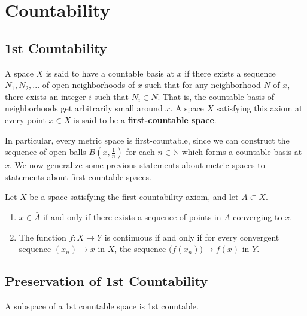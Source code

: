 \section{Countability}

\subsection{1st Countability}

  \begin{definition}[1st-Countability]
    A space $X$ is said to have a countable basis at $x$ if there exists a sequence $N_1, N_2, ...$ of open neighborhoods of $x$ such that for any neighborhood $N$ of $x$, there exists an integer $i$ such that $N_i \in N$. That is, the countable basis of neighborhoods get arbitrarily small around $x$. A space $X$ satisfying this axiom at every point $x \in X$ is said to be a \textbf{first-countable space}. 
  \end{definition}

  In particular, every metric space is first-countable, since we can construct the sequence of open balls $B (x, \frac{1}{n})$ for each $n \in \mathbb{N}$ which forms a countable basis at $x$. We now generalize some previous statements about metric spaces to statements about first-countable spaces. 

  \begin{theorem}
    Let $X$ be a space satisfying the first countability axiom, and let $A \subset X$. 
    \begin{enumerate}
      \item $x \in \bar{A}$ if and only if there exists a sequence of points in $A$ converging to $x$. 
      \item The function $f: X \longrightarrow Y$ is continuous if and only if for every convergent sequence $(x_n) \rightarrow x$ in $X$, the sequence $\big( f(x_n)\big) \rightarrow f(x)$ in $Y$. 
    \end{enumerate}
  \end{theorem}

\subsection{Preservation of 1st Countability}

  \begin{theorem}[Subspace]
    A subspace of a 1st countable space is 1st countable. 
  \end{theorem}

